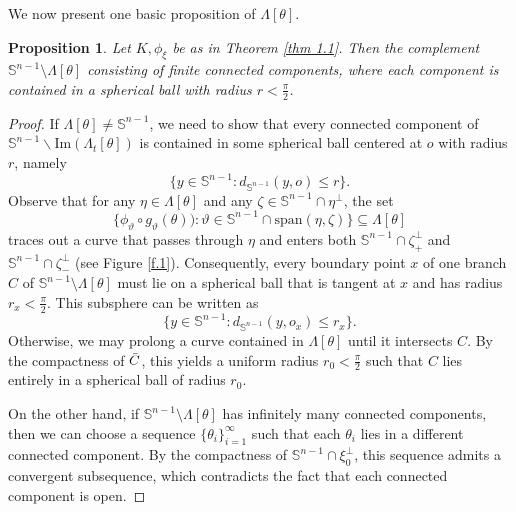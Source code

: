 \documentclass[amsfonts,reqno,11pt]{amsart}
\newtheorem{prp}{Proposition}[section]
\newcommand{\sphere}{\mathbb{S}^{n-1}}
\begin{document}
We now present one basic proposition of $\Lambda[\theta]$.
\begin{prp}\label{prp 3.1}
 Let $K, \phi_\xi$ be as in Theorem \ref{thm 1.1}. Then the complement $\sphere \setminus \Lambda[\theta]$ consisting of finite connected components, where each component is contained in a spherical ball with radius $r<\frac{\pi}{2}$.
\end{prp}
\begin{proof}
   If $\Lambda[\theta]\neq \sphere$, we need to show that every connected component of $\sphere\backslash \mathrm{Im}(\Lambda_t[\theta])$ is contained in some spherical ball centered at $o$ with radius $r$, namely
   $$
   \{y \in \sphere : d_{\sphere}(y,o)\leq r\}.
   $$
   Observe that for any $\eta\in \Lambda[\theta]$ and any $\zeta\in \sphere\cap \eta^\perp$, the set
   $$
   \{\phi_\vartheta\circ g_\vartheta(\theta)): \vartheta\in \sphere \cap \mathrm{span}(\eta,\zeta)\}\subseteq \Lambda[\theta]
   $$
   traces out a curve that passes through $\eta$ and enters both $\sphere \cap \zeta^\perp_+$ and $\sphere \cap \zeta^\perp_-$ (see Figure \ref{f.1}).
    Consequently, every boundary point $x$ of one branch $C$ of $\sphere \setminus \Lambda[\theta]$ must lie on a spherical ball that is tangent at $x$ and has radius $r_x < \frac{\pi}{2}$. This subsphere can be written as
   $$
   \{y \in \sphere : d_{\sphere}(y, o_x) \leq r_x\}.
   $$
   Otherwise, we may prolong a curve contained in $\Lambda[\theta]$ until it intersects $C$. By the compactness of $\Bar{C}$, this yields a uniform radius $r_0<\frac{\pi}{2}$ such that $C$ lies entirely in a spherical ball of radius $r_0$.

   On the other hand, if $\sphere \setminus \Lambda[\theta]$ has infinitely many connected components, then we can choose a sequence $\{\theta_i\}_{i=1}^\infty$ such that each $\theta_i$ lies in a different connected component. By the compactness of $\sphere\cap\xi_0^\perp$, this sequence admits a convergent subsequence, which contradicts the fact that each connected component is open.
\end{proof}
\end{document}

